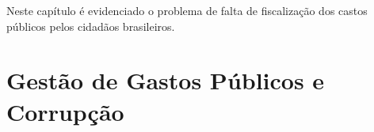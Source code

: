 Neste capítulo é evidenciado o problema de falta de fiscalização dos castos públicos pelos cidadãos brasileiros.
\section{Gestão de Gastos Públicos e Corrupção}

